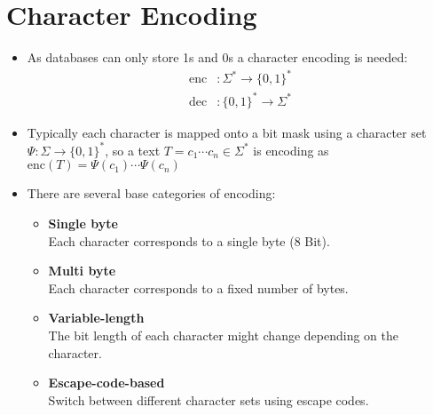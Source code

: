     \section{Character Encoding} %
        \begin{itemize}
        	\item As databases can only store 1s and 0s a character encoding is needed:
        		\begin{align*}
        			\text{enc} & : \Sigma^* \rightarrow \{ 0, 1 \}^* \tag{Encoding} \\
        			\text{dec} & : \{ 0, 1 \}^* \rightarrow \Sigma^* \tag{Decoding}
        		\end{align*}
        	\item Typically each character is mapped onto a bit mask using a character set \( \Psi : \Sigma \rightarrow \{ 0, 1 \}^* \), so a text \( T = c_1 \cdots c_n \in \Sigma^* \) is encoding as \( \text{enc}(T) = \Psi(c_1)\cdots\Psi(c_n) \)
        	\item There are several base categories of encoding:
        		\begin{itemize}
        			\item \textbf{Single byte} \\ Each character corresponds to a single byte (8 Bit).
        			\item \textbf{Multi byte} \\ Each character corresponds to a fixed number of bytes.
        			\item \textbf{Variable-length} \\ The bit length of each character might change depending on the character.
        			\item \textbf{Escape-code-based} \\ Switch between different character sets using escape codes.
        		\end{itemize}
        \end{itemize}

